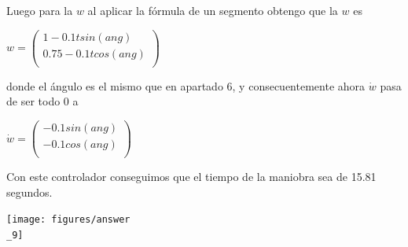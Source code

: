 \documentclass[a4paper]{article}
\begin{document}
\begin{itemize}
Luego para la $w$ al aplicar la fórmula de un segmento obtengo que la $w$ es

\begin{center}
	$w = \begin{pmatrix}
		1-0.1tsin(ang)\\       
		0.75-0.1tcos(ang)\\      
	\end{pmatrix}$
\end{center}

donde el ángulo es el mismo que en apartado 6, y consecuentemente ahora $\dot{w}$ pasa de ser todo 0 a 

\begin{center}
	$\dot{w} = \begin{pmatrix}
		-0.1sin(ang)\\       
		-0.1cos(ang)\\      
	\end{pmatrix}$
\end{center}

Con este controlador conseguimos que el tiempo de la maniobra sea de 15.81 segundos.

\begin{center}
	\texttt{[image: figures/answer\\\_9]}
\end{center}

\bigskip

\end{itemize}
\end{document}
